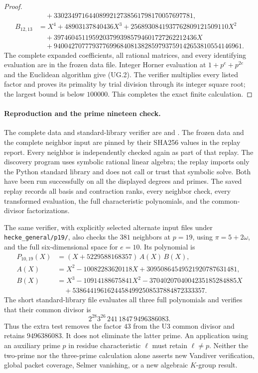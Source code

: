 \documentclass[11pt,a4paper]{article}
\theoremstyle{definition}
\begin{document}
\begin{proof}
\[\begin{aligned}
          &\quad+3302349716440899212738561798170057697781,\\
 B_{12,13}&=X^4+48903137840436X^3+2568930841937762809121509110X^2\\
          &\quad+39746045119592037993985794601727262212436X\\
          &\quad+940042707779377699684081382859793759142653810554146961.
\end{aligned}
\tag{UG.12}
\]
The complete expanded coefficients, all rational matrices, and
every identifying evaluation are in the frozen data file.
Integer Horner evaluation at $1+p^e+p^{2e}$ and the Euclidean
algorithm give (UG.2). The verifier multiplies every listed
factor and proves its primality by trial division through its
integer square root; the largest bound is below $100000$.
This completes the exact finite calculation.
\end{proof}

\paragraph{Reproduction and the prime nineteen check.}
The complete data and standard-library verifier are
 and
.
The frozen data and the complete neighbor input are pinned by
their SHA256 values in the replay report. Every neighbor is
independently checked again as part of that replay.
The discovery program uses symbolic rational linear algebra;
the replay imports only the Python standard library and does not
call or trust that symbolic solve. Both have been run successfully
on all the displayed degrees and primes. The saved replay records
all basis and contraction ranks, every neighbor check, every
transformed evaluation, the full characteristic polynomials,
and the common-divisor factorizations.

The same verifier, with explicitly selected alternate input files
under \texttt{hecke\_general/p19/}, also checks the $381$ neighbors
at $p=19$, using $\pi=5+2\omega$, and the full six-dimensional
space for $e=10$. Its polynomial is
\[
\begin{aligned}
 P_{10,19}(X)&=(X+5229588168357)\,A(X)\,B(X),\\
 A(X)&=X^2-10082283620118X+30950864549521920787631481,\\
 B(X)&=X^3-10914188675841X^2-3704020704004235185284885X\\
     &\quad+53864419616244584992508537884872333357.
\end{aligned}
\tag{UG.13}
\]
The short standard-library file
 evaluates all
three full polynomials and verifies that their common divisor is
\[
 2^{28}3^{26}\,241\,1847\,9496386083.
 \tag{UG.14}
\]
Thus the extra test removes the factor $43$ from the U3 common divisor
and retains $9496386083$. It does not eliminate the latter prime.
An application using an auxiliary prime $p$ in residue characteristic
$\ell$ must retain $\ell\ne p$. Neither the two-prime nor the
three-prime calculation alone asserts new Vandiver verification,
global packet coverage, Selmer vanishing, or a new algebraic $K$-group
result.
\end{document}
